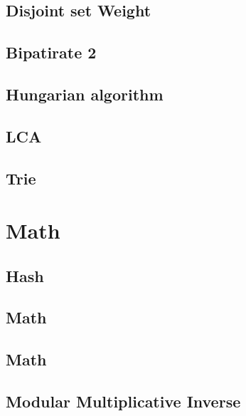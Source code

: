         \subsection{Disjoint set Weight}
                
        \subsection{Bipatirate 2}
                
        \subsection{Hungarian algorithm}
                
        \subsection{LCA}
                
        \subsection{Trie}
                

\section{Math}
        \subsection{Hash}
                
        \subsection{Math}
                
        \subsection{Math}
                
        \subsection{Modular Multiplicative Inverse}
                

